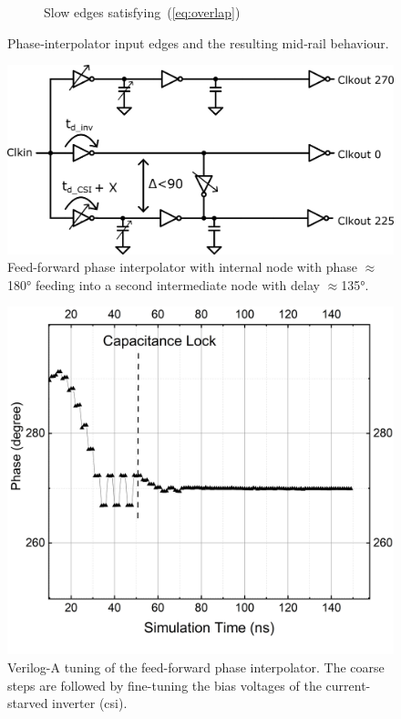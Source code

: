 \begin{figure}[htbp]
\begin{subfigure}[b]{0.40\linewidth}
    \caption{Slow edges satisfying~(\ref{eq:overlap})}
    \label{fig:slow}
  \end{subfigure}
  \caption{Phase‑interpolator input edges and the resulting mid‑rail behaviour.}
  \label{fig:pi_edges}
\end{figure}

\begin{figure}[htbp]
  \centering
  \includegraphics[width=0.6\linewidth]{figures/Schematics/ff_csi_3out.png}
  \caption{Feed-forward phase interpolator with internal node with phase $\approx$\ang{180} feeding into a second intermediate node with delay $\approx$\ang{135}.}
  \label{fig:FF_half_1}
\end{figure}

\begin{figure}[htbp]
  \centering
  \includegraphics[width=0.5\linewidth]{figures/Results/FF_3out_CSI_dynamicTuning-225And270TuningCapAndVb.png}
  \caption{Verilog-A tuning of the feed-forward phase interpolator. The coarse steps are followed by fine-tuning the bias voltages of the current-starved inverter (\gls{csi}).}
  \label{fig:FF_half_Verilog-A_tuning}
\end{figure}

